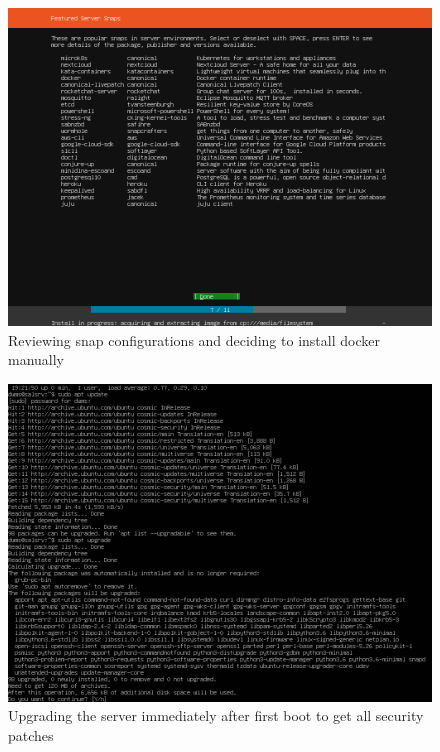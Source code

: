\begin{figure}[h!]
\centering
\captionsetup{skip=\skipfigurecaptionlen}
\includegraphics[width=1\textwidth]{screenshots/IY2D502-2019-02-21-19-17-58.png}
\caption{Reviewing snap configurations and deciding to install docker manually}
\label{fig:IY2D502-2019-02-21-19-17-58}
\end{figure}
\pagebreak
\begin{figure}[h!]
\centering
\captionsetup{skip=\skipfigurecaptionlen}
\includegraphics[width=1\textwidth]{screenshots/IY2D502-2019-02-21-19-22-44.png}
\caption{Upgrading the server immediately after first boot to get all security patches}
\label{fig:IY2D502-2019-02-21-19-22-44}
\end{figure}

